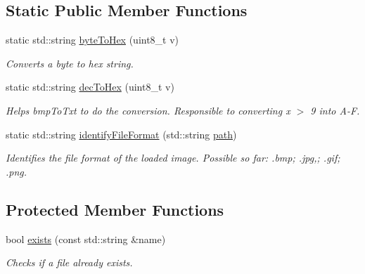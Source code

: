 \subsection*{Static Public Member Functions}
\begin{DoxyCompactItemize}
\item 
static std\+::string \mbox{\hyperlink{classImage_ac1c14eba8a20f8bb71c3c21eaba90ecb}{byte\+To\+Hex}} (uint8\+\_\+t v)
\begin{DoxyCompactList}\small\item\em Converts a byte to hex string. \end{DoxyCompactList}\item 
static std\+::string \mbox{\hyperlink{classImage_a26f7e0b2649e2529df7e7aea46f2da4a}{dec\+To\+Hex}} (uint8\+\_\+t v)
\begin{DoxyCompactList}\small\item\em Helps bmp\+To\+Txt to do the conversion. Responsible to converting x $>$ 9 into A-\/F. \end{DoxyCompactList}\item 
static std\+::string \mbox{\hyperlink{classImage_ac4e8db14cfd60a6a7085e6fcb83488a4}{identify\+File\+Format}} (std\+::string \mbox{\hyperlink{classImage_aec8a33f176362d146da8c058798ebbff}{path}})
\begin{DoxyCompactList}\small\item\em Identifies the file format of the loaded image. Possible so far\+: .bmp; .jpg,; .gif; .png. \end{DoxyCompactList}\end{DoxyCompactItemize}
\subsection*{Protected Member Functions}
\begin{DoxyCompactItemize}
\item 
bool \mbox{\hyperlink{classImage_a83d7183bfcd632649c36504d9ab07e36}{exists}} (const std\+::string \&name)
\begin{DoxyCompactList}\small\item\em Checks if a file already exists. \end{DoxyCompactList}\end{DoxyCompactItemize}
